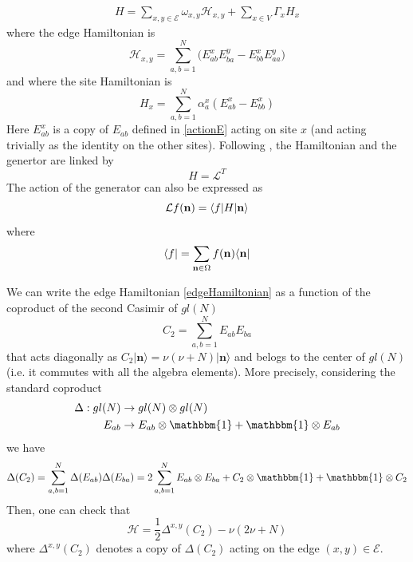 \documentclass[11pt]{article}
\numberwithin{equation}{section}
\numberwithin{equation}{subsection}
\newcommand{\twoj}{\nu}
\begin{document}
\begin{equation}\label{OriginalHamiltonian}
	\begin{split}
		H=\sum_{x,y\in \mathcal{E}}\omega_{x,y}\mathcal{H}_{x,y}+\sum_{x\in V}\Gamma_{x}H_{x}
	\end{split}
\end{equation}
where the edge Hamiltonian is
\begin{equation}\label{edgeHamiltonian}
\mathcal{H}_{x,y}=\sum_{a,b=1}^{N}\Big(E_{ab}^{x} E_{b a}^{y}-E_{bb}^{x} E_{aa}^{y}\Big)
 \end{equation}
  and where the site Hamiltonian is
 \begin{equation}\label{siteHamiltonian}
H_{x}=\sum_{a,b=1}^{N}\alpha_{a}^{x}\left(E_{ab}^{x}-E_{bb}^{x}\right)
\end{equation}
Here $E_{ab}^{x}$ is a copy of $E_{ab}$ defined in \eqref{actionE} acting on site $x$ (and
acting trivially as the identity on the other sites). 
Following  \cite{belitsky2015self}, the Hamiltonian and the genertor are linked by
\begin{equation}\label{Hamiltonian-Generator}
H=\mathcal{L}^{T}
\end{equation}
The action of the generator can also be expressed as 
\begin{equation}
    \mathcal{L}f( {\bf n})=\langle f|H| {\bf n}\rangle
\end{equation}
where 
\begin{equation}
    \langle f|=\sum_{ {{\bf n}\in \Omega}}f( {\bf n})\langle  {\bf n}|
\end{equation}

We can write the edge Hamiltonian \eqref{edgeHamiltonian} as a function of the coproduct of the second Casimir of $gl(N)$
\begin{equation}\label{secondCasimir}
    C_{2}=\sum_{a,b=1}^{N}E_{ab}E_{ba}
\end{equation}
that acts diagonally as $C_{2}|\mathbf{n}\rangle=\twoj(\twoj+N)|\mathbf{n}\rangle$ and belogs to the center of $gl(N)$ (i.e. it commutes with all the algebra elements).  
More precisely,  considering the standard coproduct 
\begin{equation}
\begin{split}
\Delta:gl(N)&\to gl(N)\otimes gl(N)\\
E_{ab}&\to E_{ab}\otimes \mathbbm{1}+\mathbbm{1}\otimes E_{ab}
\end{split}
\end{equation}
we have 
\begin{equation}
\Delta(C_{2})=\sum_{a,b=1}^{N}\Delta(E_{ab})\Delta(E_{ba})=2\sum_{a,b=1}^{N}E_{ab}\otimes E_{ba}+C_{2}\otimes \mathbbm{1}+\mathbbm{1}\otimes C_{2}
\end{equation}
Then, one can check that 
\begin{equation}\label{hamiltonianCasimir}
	\mathcal{H}=\frac{1}{2}\Delta^{x,y}(C_{2})-\twoj(2\twoj+N)
\end{equation}
where $\Delta^{x,y}(C_2)$ denotes a copy of $\Delta(C_2)$ acting on  
the edge $(x,y)\in \mathcal{E}$.
\end{document}
